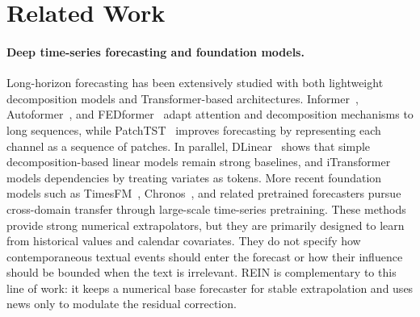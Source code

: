 \documentclass{article}
\newcommand{\method}{REIN\xspace}
\begin{document}
\section{Related Work}
\label{sec:related}

\paragraph{Deep time-series forecasting and foundation models.}
Long-horizon forecasting has been extensively studied with both lightweight decomposition models and Transformer-based architectures. Informer~\citep{informer_zhou2021}, Autoformer~\citep{autoformer}, and FEDformer~\citep{zhou2022fedformerfrequencyenhanceddecomposed} adapt attention and decomposition mechanisms to long sequences, while PatchTST~\citep{patchtst_nie2023} improves forecasting by representing each channel as a sequence of patches. In parallel, DLinear~\citep{dlinear_zeng2023} shows that simple decomposition-based linear models remain strong baselines, and iTransformer~\citep{itransformer_liu2024} models dependencies by treating variates as tokens. More recent foundation models such as TimesFM~\citep{timellm_jin2024}, Chronos~\citep{ansari2024chronoslearninglanguagetime}, and related pretrained forecasters pursue cross-domain transfer through large-scale time-series pretraining. These methods provide strong numerical extrapolators, but they are primarily designed to learn from historical values and calendar covariates. They do not specify how contemporaneous textual events should enter the forecast or how their influence should be bounded when the text is irrelevant. \method is complementary to this line of work: it keeps a numerical base forecaster for stable extrapolation and uses news only to modulate the residual correction.
\end{document}
